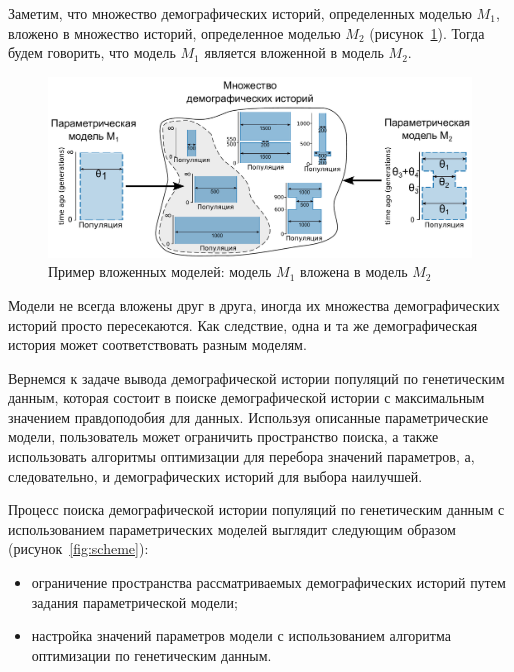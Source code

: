 \documentclass[a4paper,14pt,oneside,openany,article]{memoir}
\begin{document}
Заметим, что множество демографических историй, определенных моделью $M_1$, вложено в множество историй, определенное моделью $M_2$ (рисунок~\ref{fig:nested_models}).
Тогда будем говорить, что модель $M_1$ является вложенной  в модель $M_2$. 

\begin{figure}[h]
    \centering
    \includegraphics[width=\textwidth]{images_2/nested_models.pdf}
    \caption{Пример вложенных моделей: модель $M_1$ вложена в модель $M_2$}
    \label{fig:nested_models}
\end{figure}

Модели не всегда вложены друг в друга, иногда их множества демографических историй просто пересекаются.
Как следствие, одна и та же демографическая история может соответствовать разным моделям.

Вернемся к задаче вывода демографической истории популяций по генетическим данным, которая состоит в поиске демографической истории с максимальным значением правдоподобия для данных.
Используя описанные параметрические модели, пользователь может ограничить пространство поиска, а также использовать алгоритмы оптимизации для перебора значений параметров, а, следовательно, и демографических историй для выбора наилучшей.

Процесс поиска демографической истории  популяций по генетическим данным с использованием параметрических моделей выглядит следующим образом (рисунок~\ref{fig:scheme}):
\begin{itemize}
    \item ограничение пространства рассматриваемых демографических историй путем задания параметрической модели;
    \item настройка значений параметров модели с использованием алгоритма оптимизации по генетическим данным.
\end{itemize}
\end{document}
